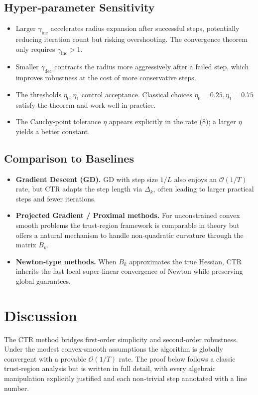 \documentclass[11pt]{article}
\begin{document}
\subsection{Hyper‑parameter Sensitivity}
\begin{itemize}
\item Larger \(\gamma_{\mathrm{inc}}\) accelerates radius expansion after successful steps, potentially reducing iteration count but risking overshooting. The convergence theorem only requires \(\gamma_{\mathrm{inc}}>1\).
\item Smaller \(\gamma_{\mathrm{dec}}\) contracts the radius more aggressively after a failed step, which improves robustness at the cost of more conservative steps.
\item The thresholds \(\eta_0,\eta_1\) control acceptance. Classical choices \(\eta_0=0.25,\eta_1=0.75\) satisfy the theorem and work well in practice.
\item The Cauchy‑point tolerance \(\eta\) appears explicitly in the rate (8); a larger \(\eta\) yields a better constant.
\end{itemize}

\subsection{Comparison to Baselines}
\begin{itemize}
\item \textbf{Gradient Descent (GD).} GD with step size \(1/L\) also enjoys an \(\mathcal{O}(1/T)\) rate, but CTR adapts the step length via \(\Delta_k\), often leading to larger practical steps and fewer iterations.
\item \textbf{Projected Gradient / Proximal methods.} For unconstrained convex smooth problems the trust‑region framework is comparable in theory but offers a natural mechanism to handle non‑quadratic curvature through the matrix \(B_k\).
\item \textbf{Newton‑type methods.} When \(B_k\) approximates the true Hessian, CTR inherits the fast local super‑linear convergence of Newton while preserving global guarantees.
\end{itemize}

\section*{Discussion}
The CTR method bridges first‑order simplicity and second‑order robustness. Under the modest convex‑smooth assumptions the algorithm is globally convergent with a provable \(\mathcal{O}(1/T)\) rate. The proof below follows a classic trust‑region analysis but is written in full detail, with every algebraic manipulation explicitly justified and each non‑trivial step annotated with a line number.
\end{document}
